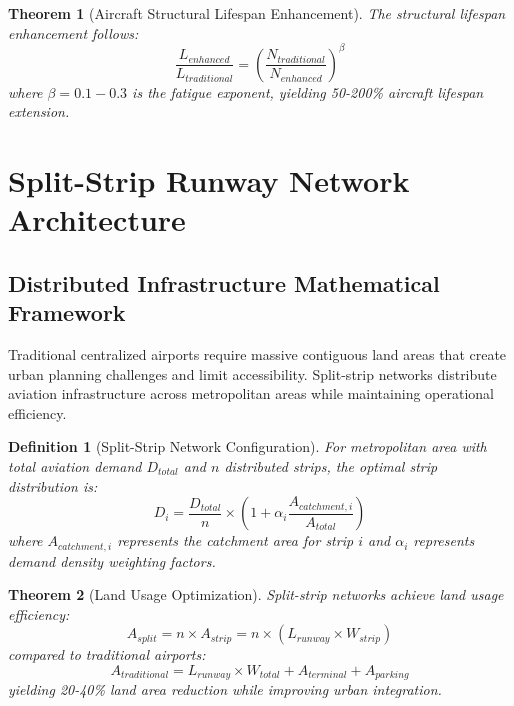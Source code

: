 \documentclass[12pt,a4paper]{article}
\newtheorem{theorem}{Theorem}
\newtheorem{definition}{Definition}
\begin{document}
\begin{theorem}[Aircraft Structural Lifespan Enhancement]
The structural lifespan enhancement follows:
\begin{equation}
\frac{L_{enhanced}}{L_{traditional}} = \left(\frac{N_{traditional}}{N_{enhanced}}\right)^{\beta}
\end{equation}
where $\beta = 0.1-0.3$ is the fatigue exponent, yielding 50-200\% aircraft lifespan extension.
\end{theorem}

\section{Split-Strip Runway Network Architecture}

\subsection{Distributed Infrastructure Mathematical Framework}

Traditional centralized airports require massive contiguous land areas that create urban planning challenges and limit accessibility. Split-strip networks distribute aviation infrastructure across metropolitan areas while maintaining operational efficiency.

\begin{definition}[Split-Strip Network Configuration]
For metropolitan area with total aviation demand $D_{total}$ and $n$ distributed strips, the optimal strip distribution is:
\begin{equation}
D_i = \frac{D_{total}}{n} \times \left(1 + \alpha_i \frac{A_{catchment,i}}{A_{total}}\right)
\end{equation}
where $A_{catchment,i}$ represents the catchment area for strip $i$ and $\alpha_i$ represents demand density weighting factors.
\end{definition}

\begin{theorem}[Land Usage Optimization]
Split-strip networks achieve land usage efficiency:
\begin{equation}
A_{split} = n \times A_{strip} = n \times (L_{runway} \times W_{strip})
\end{equation}
compared to traditional airports:
\begin{equation}
A_{traditional} = L_{runway} \times W_{total} + A_{terminal} + A_{parking}
\end{equation}
yielding 20-40\% land area reduction while improving urban integration.
\end{theorem}
\end{document}
